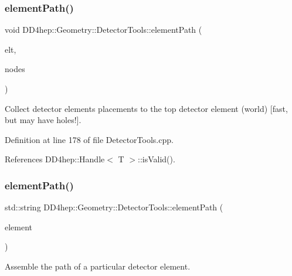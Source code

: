 \subsubsection{\texorpdfstring{element\+Path()}{elementPath()}\hspace{0.1cm}{\footnotesize\ttfamily [3/7]}}
{\footnotesize\ttfamily void D\+D4hep\+::\+Geometry\+::\+Detector\+Tools\+::element\+Path (\begin{DoxyParamCaption}\item[{\hyperlink{class_d_d4hep_1_1_geometry_1_1_det_element}{Det\+Element}}]{elt,  }\item[{\hyperlink{namespace_d_d4hep_1_1_geometry_1_1_detector_tools_a6cc33285199e04dd336a33e6e62925e6}{Placement\+Path} \&}]{nodes }\end{DoxyParamCaption})}



Collect detector elements placements to the top detector element (world) \mbox{[}fast, but may have holes!\mbox{]}. 



Definition at line 178 of file Detector\+Tools.\+cpp.



References D\+D4hep\+::\+Handle$<$ T $>$\+::is\+Valid().

\hypertarget{namespace_d_d4hep_1_1_geometry_1_1_detector_tools_aa236d3ca69ed2eb4d7777db7c080216b}{}\label{namespace_d_d4hep_1_1_geometry_1_1_detector_tools_aa236d3ca69ed2eb4d7777db7c080216b} 
\subsubsection{\texorpdfstring{element\+Path()}{elementPath()}\hspace{0.1cm}{\footnotesize\ttfamily [4/7]}}
{\footnotesize\ttfamily std\+::string D\+D4hep\+::\+Geometry\+::\+Detector\+Tools\+::element\+Path (\begin{DoxyParamCaption}\item[{\hyperlink{class_d_d4hep_1_1_geometry_1_1_det_element}{Det\+Element}}]{element }\end{DoxyParamCaption})}



Assemble the path of a particular detector element. 



